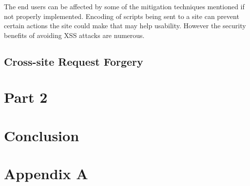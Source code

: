 \documentclass{ueacmpstyle}
\begin{document}
      The end users can be affected by some of the mitigation techniques mentioned if not 
      properly implemented. Encoding of scripts being sent to a site can prevent certain 
      actions the site could make that may help usability. However the security benefits 
      of avoiding XSS attacks are numerous.

      \subsection{Cross-site Request Forgery}\label{sub:CSRF}
      
        
    \section{Part 2}\label{sec:Pt2}


    \section{Conclusion}\label{sec:Con}

    
    

	
	
	\newpage
	
	\appendix
        \section{Appendix A}\label{app:A}   %
\end{document}
